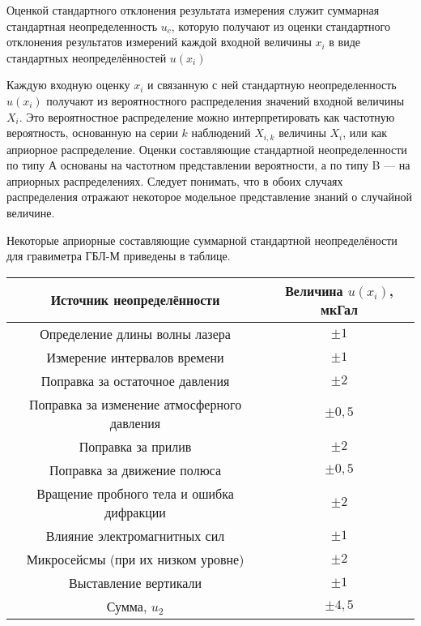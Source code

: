 \documentclass[12pt, a4paper]{article}
\theoremstyle{remark}
\begin{document}
\begin{enumerate}
    Оценкой стандартного отклонения результата измерения служит суммарная стандартная
    неопределенность $u_c$, которую получают из оценки стандартного отклонения результатов измерений
    каждой входной величины $x_i$ в виде стандартных неопределённостей $u(x_i)$

    Каждую входную оценку $x_i$ и связанную с ней стандартную неопределенность $u(x_i)$ получают 
    из вероятностного распределения значений входной величины $X_i$. Это вероятностное
    распределение можно интерпретировать как частотную вероятность, основанную на серии $k$
    наблюдений $X_{i,k}$ величины $X_i$, или как априорное распределение. Оценки составляющие
    стандартной неопределенности по типу А основаны на частотном представлении вероятности, а по
    типу B --- на априорных распределениях. Следует понимать, что в обоих случаях распределения
    отражают некоторое модельное представление знаний о случайной величине.
    
    Некоторые априорные составляющие суммарной стандартной неопределёности для гравиметра ГБЛ-М
    приведены в таблице.
    \begin{table}[h]
        \centering
        \begin{tabular}{|c|c|}
            \hline
            Источник неопределённости & Величина $u (x_i)$, мкГал \\\hline
            Определение длины волны лазера & $\pm 1$ \\
            Измерение интервалов времени & $\pm 1$ \\\hline
            Поправка за остаточное давления  & $\pm 2$ \\
            Поправка за изменение атмосферного давления & $\pm 0,5$\\
            Поправка за прилив & $\pm 2$\\  
            Поправка за движение полюса & $\pm 0,5$\\\hline  
            Вращение пробного тела и ошибка дифракции & $\pm 2$\\  
            Влияние электромагнитных сил & $\pm 1$\\  
            Микросейсмы (при их низком уровне) & $\pm 2$\\  
            Выставление вертикали & $\pm 1$\\\hline
            Сумма, $u_2$ & $\pm 4,5$ \\\hline
        \end{tabular}
    \end{table}


\end{enumerate}
\end{document}
